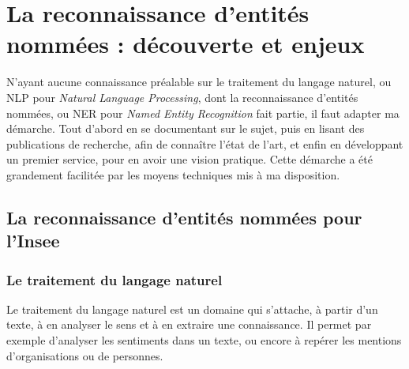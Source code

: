 \section{La reconnaissance d'entités nommées : découverte et enjeux}
N'ayant aucune connaissance préalable sur le traitement du langage naturel, ou NLP pour \textit{Natural Language Processing}, dont la reconnaissance d'entités nommées, ou NER pour \textit{Named Entity Recognition} fait partie, il faut adapter ma démarche. Tout d'abord en se documentant sur le sujet, puis en lisant des publications de recherche, afin de connaître l'état de l'art, et enfin en développant un premier service, pour en avoir une vision pratique. Cette démarche a été grandement facilitée par les moyens techniques mis à ma disposition.
\newline

\subsection{La reconnaissance d'entités nommées pour l'Insee}

\subsubsection{Le traitement du langage naturel}
Le traitement du langage naturel est un domaine qui s'attache, à partir d'un texte, à en analyser le sens et à en extraire une connaissance. Il permet par exemple d'analyser les sentiments dans un texte, ou encore à repérer les mentions d'organisations ou de personnes.
\newline

